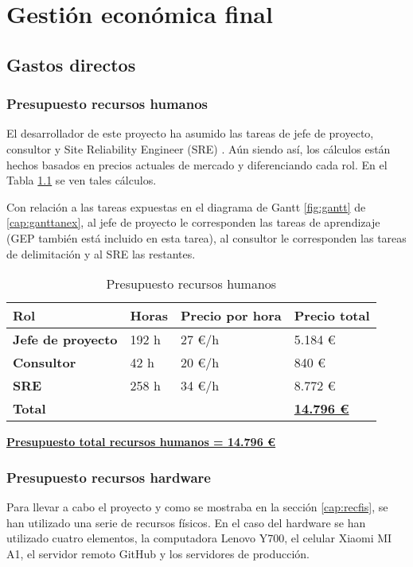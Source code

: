 \chapter{Gestión económica final}\label{cap:gestionec}
\section{Gastos directos}
\subsection{Presupuesto recursos humanos}
El desarrollador de este proyecto ha asumido las tareas de jefe de proyecto, consultor y Site Reliability Engineer (SRE) \cite{Tfg:sre}. Aún siendo así, los cálculos están hechos basados en precios actuales de mercado y diferenciando cada rol. En el Tabla \ref{tab:preprechum} se ven tales cálculos.

Con relación a las tareas expuestas en el diagrama de Gantt \ref{fig:gantt} de \ref{cap:ganttanex}, al jefe de proyecto le corresponden las tareas de aprendizaje (GEP también está incluido en esta tarea), al consultor le corresponden las tareas de delimitación y al SRE las restantes.


\begin{table}[H]\label{tab:preprechum}
	\centering
	\begin{tabular}{|l|l|l|l|}
		\hline
		\textbf{Rol}              & \textbf{Horas} & \textbf{Precio por hora}         & \textbf{Precio total}  \\ \hline
		\textbf{Jefe de proyecto} & 192 h          & 27 €/h \cite{Tfg:projectmanager} & 5.184 €                \\ \hline
		\textbf{Consultor}        & 42 h           & 20 €/h \cite{Tfg:itconsultant}   & 840 €                  \\ \hline
		\textbf{SRE}              & 258 h          & 34 €/h \cite{Tfg:sresalary}      & 8.772 €                \\ \hline
		\multicolumn{3}{|l|}{\textbf{Total}} & \textbf{\underline{14.796 €}}                                   \\ \hline
	\end{tabular}
	\caption{Presupuesto recursos humanos}
\end{table}


\textbf{\underline{Presupuesto total recursos humanos = 14.796 €}}

\subsection{Presupuesto recursos hardware}\label{sec:presrechard}
Para llevar a cabo el proyecto y como se mostraba en la sección \ref{cap:recfis}, se han utilizado una serie de recursos físicos. En el caso del hardware se han utilizado cuatro elementos, la computadora Lenovo Y700, el celular Xiaomi MI A1, el servidor remoto GitHub y los servidores de producción. 

